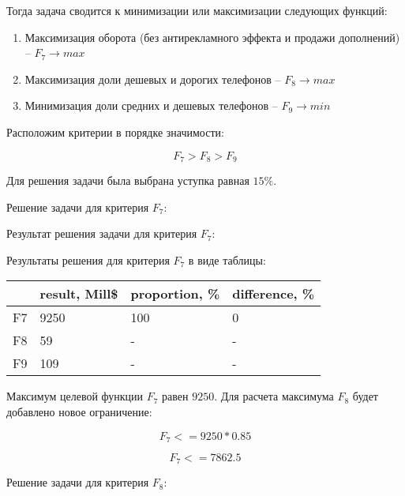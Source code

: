 \documentclass[14pt,a4paper,report]{report}
\begin{document}
Тогда задача сводится к минимизации или максимизации следующих функций:

\begin{enumerate}
	\item Максимизация оборота (без антирекламного эффекта и продажи дополнений) -- $F_7\rightarrow max$
	\item Максимизация доли дешевых и дорогих телефонов -- $F_8\rightarrow max$
	\item Минимизация доли средних и дешевых телефонов -- $F_9\rightarrow min$
\end{enumerate}

Расположим критерии в порядке значимости:

\begin{equation*}
\text{$F_7>F_8>F_9$}
\end{equation*}

Для решения задачи была выбрана уступка равная $15\%$.

Решение задачи для критерия $F_7$:



Результат решения задачи для критерия $F_7$:



Результаты решения для критерия $F_7$ в виде таблицы:

\begin{table}[h!]
	\centering
	\bgroup
	\def\arraystretch{1}
	\begin{tabular}{ | m{1.2cm} | m{1.9cm} | m{2.2cm} | m{2.2cm} | }
		\hline
		& result, Mill\$ & proportion, \% & difference, \% \\ \hline
		F7 & 9250 & 100 & 0 \\ \hline
		F8 & 59 & - & - \\ \hline
		F9 & 109 & - & - \\
		\hline
	\end{tabular}
	\egroup
\end{table}

Максимум целевой функции $F_7$ равен $9250$. Для расчета максимума $F_8$ будет добавлено новое ограничение:

\begin{equation*}
\text{$F_7<=9250*0.85$}
\end{equation*}

\begin{equation*}
\text{$F_7<=7862.5$}
\end{equation*}

Решение задачи для критерия $F_8$:
\end{document}
